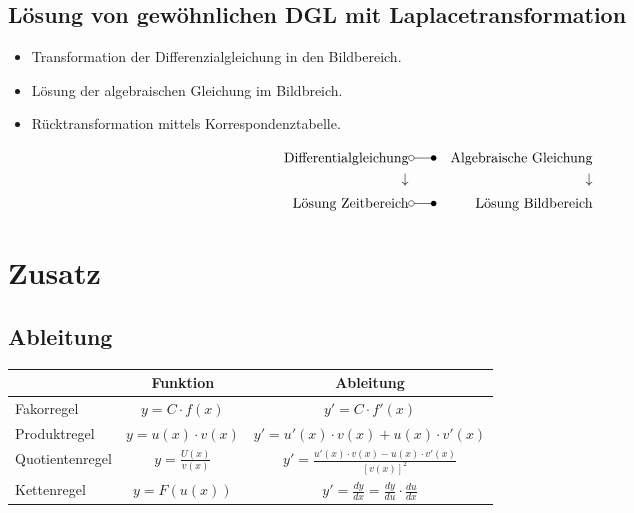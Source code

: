 \documentclass[12pt]{article}
\begin{document}
\subsection{Lösung von gewöhnlichen DGL mit Laplacetransformation}
\begin{itemize}
	\item Transformation der Differenzialgleichung in den Bildbereich.
	\item Lösung der algebraischen Gleichung im Bildbreich.
	\item Rücktransformation mittels Korrespondenztabelle.
\end{itemize}
\begin{eqnarray*}
	\text{Differentialgleichung} & \laplace & \text{Algebraische Gleichung}\\
	\downarrow & & \downarrow \\
	\text{Lösung Zeitbereich} & \laplace & \text{Lösung Bildbereich}
\end{eqnarray*}
\section{Zusatz}
\subsection{Ableitung}
\begin{table}[H]
	\centering
	\begin{tabular}{|l|c|c|}
		\hline
		 & Funktion & Ableitung\\\hline\hline
		Fakorregel & $y = C \cdot f(x)$ & $y' = C\cdot f'(x)$\\\hline
		Produktregel & $y=u(x)\cdot v(x)$ & $y'=u'(x)\cdot v(x)+u(x)\cdot v'(x)$\\\hline
		Quotientenregel & $y=\frac{U(x)}{v(x)}$ & $y'=\frac{u'(x)\cdot v(x)-u(x)\cdot v'(x)}{\left[v(x)\right]^2}$\\\hline
		Kettenregel & $y=F(u(x))$ & $y'=\frac{dy}{dx}=\frac{dy}{du}\cdot\frac{du}{dx}$\\\hline
	\end{tabular}	
\end{table}
\end{document}
